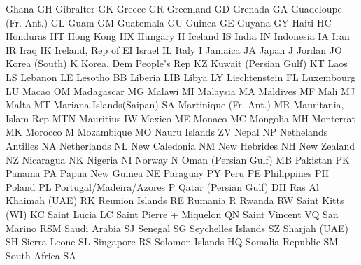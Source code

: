 {{{{Ghana                   GH      Gibralter               GK
Greece                  GR      Greenland               GD
Grenada                 GA      Guadeloupe (Fr. Ant.)   GL
Guam                    GM      Guatemala               GU
Guinea                  GE      Guyana                  GY
Haiti                   HC      Honduras                HT
Hong Kong               HX      Hungary                 H
Iceland                 IS      India                   IN
Indonesia               IA      Iran                    IR
Iraq                    IK      Ireland, Rep of         EI 
Israel                  IL      Italy                   I
Jamaica                 JA      Japan                   J
Jordan                  JO      Korea (South)           K
Korea, Dem People's Rep KZ      Kuwait (Persian Gulf)   KT
Laos                    LS      Lebanon                 LE
Lesotho                 BB      Liberia                 LIB
Libya                   LY      Liechtenstein           FL
Luxembourg              LU      Macao                   OM
Madagascar              MG      Malawi                  MI
Malaysia                MA      Maldives                MF
Mali                    MJ      Malta                   MT
Mariana Islands(Saipan) SA      Martinique (Fr. Ant.)   MR
Mauritania, Islam Rep   MTN     Mauritius               IW
Mexico                  ME      Monaco                  MC
Mongolia                MH      Monterrat               MK 
Morocco                 M       Mozambique              MO 
Nauru Islands           ZV      Nepal                   NP
Nethelands Antilles     NA      Netherlands             NL
New Caledonia           NM      New Hebrides            NH
New Zealand             NZ      Nicaragua               NK
Nigeria                 NI      Norway                  N
Oman (Persian Gulf)     MB      Pakistan                PK
Panama                  PA      Papua New Guinea        NE
Paraguay                PY      Peru                    PE 
Philippines             PH      Poland                  PL
Portugal/Madeira/Azores P       Qatar (Persian Gulf)    DH
Ras Al Khaimah (UAE)    RK      Reunion Islands         RE
Rumania                 R       Rwanda                  RW
Saint Kitts (WI)        KC      Saint Lucia             LC
Saint Pierre + Miquelon QN      Saint Vincent           VQ
San Marino              RSM     Saudi Arabia            SJ
Senegal                 SG      Seychelles Islands      SZ
Sharjah (UAE)           SH      Sierra Leone            SL
Singapore               RS      Solomon Islands         HQ
Somalia Republic        SM      South Africa            SA
}}}}
